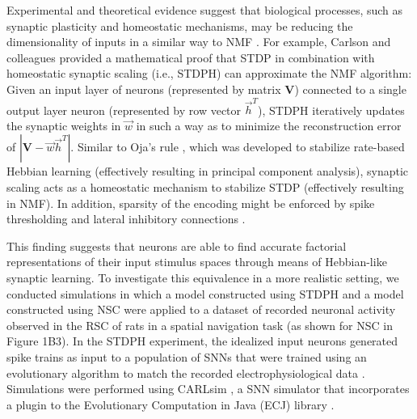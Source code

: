 Experimental and theoretical evidence suggest that biological processes, such as synaptic plasticity and homeostatic mechanisms, may be reducing the dimensionality of inputs in a similar way to \ac{NMF}
\cite{Perrinet2010,Clopath2010,IzhikevichDesai2003}.
For example, Carlson and colleagues \cite{Carlson2013} provided a mathematical proof that
\ac{STDP} in combination with homeostatic synaptic scaling (i.e., \ac{STDPH})
can approximate the \ac{NMF} algorithm:
Given an input layer of neurons (represented by matrix \textbf{V}) connected to a single output layer neuron (represented by row vector $\vec{h}^T$), \ac{STDPH} iteratively updates the synaptic weights in $\vec{w}$ in such a way as to minimize the reconstruction error of $|\mathbf{V} - \vec{w} \vec{h}^T|$.
Similar to Oja's rule \cite{Oja1982}, which was developed to stabilize 
rate-based Hebbian learning
(effectively resulting in principal component analysis),
synaptic scaling acts as a homeostatic mechanism to stabilize \ac{STDP}
(effectively resulting in \ac{NMF}).
In addition, sparsity of the encoding might be enforced by spike thresholding \cite{Rozell2008} and lateral inhibitory connections \cite{Coultrip1992}.

This finding suggests that neurons are able to find accurate factorial
representations of their input stimulus spaces through means of Hebbian-like
synaptic learning. 
To investigate this equivalence
in a more realistic setting,
we conducted simulations in which a model constructed using \ac{STDPH}
and a model constructed using \ac{NSC}
were applied to a dataset of recorded neuronal activity 
observed in the \ac{RSC} of rats in a  spatial navigation task 
(as shown for \ac{NSC} in Figure 1B3). 
In the \ac{STDPH} experiment, the idealized input neurons generated spike trains as input to a population of \acp{SNN} that were trained using an evolutionary algorithm
to match the recorded electrophysiological data \cite{Rounds2016}.
Simulations were performed using CARLsim \cite{BeyelerCarlsonChou2015}, a \ac{SNN} simulator that incorporates a plugin \cite{Carlson2014} to the Evolutionary Computation in Java (ECJ) library \cite{white2012}.

